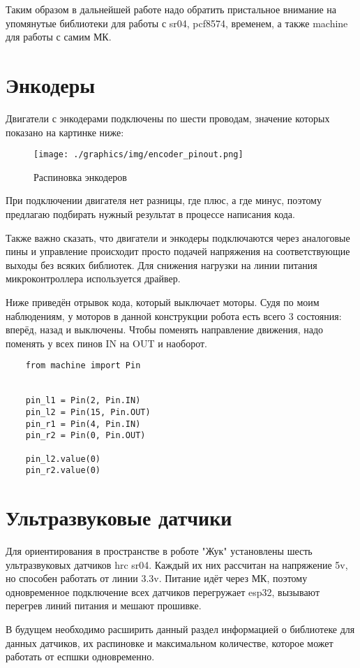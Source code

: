 Таким образом в дальнейшей работе надо обратить пристальное внимание на упомянутые библиотеки для работы с sr04, pcf8574, временем, а также machine для работы с самим МК.

\chapter{Энкодеры}
Двигатели с энкодерами подключены по шести проводам, значение которых показано на картинке ниже:

\begin{figure}[!h]
    \texttt{[image: ./graphics/img/encoder\_pinout.png]}
    \caption{Распиновка энкодеров}
    \label{f:enc_pinout}
\end{figure}

При подключении двигателя нет разницы, где плюс, а где минус, поэтому предлагаю подбирать нужный результат в процессе написания кода.

Также важно сказать, что двигатели и энкодеры подключаются через аналоговые пины и управление происходит просто подачей напряжения на соответствующие выходы без всяких библиотек. Для снижения нагрузки на линии питания микроконтроллера используется драйвер.

Ниже приведён отрывок кода, который выключает моторы. Судя по моим наблюдениям, у моторов в данной конструкции робота есть всего 3 состояния: вперёд, назад и выключены. Чтобы поменять направление движения, надо поменять у всех пинов IN на OUT и наоборот.

{\ttfamily
\begin{verbatim}
    from machine import Pin


    pin_l1 = Pin(2, Pin.IN)
    pin_l2 = Pin(15, Pin.OUT)
    pin_r1 = Pin(4, Pin.IN)
    pin_r2 = Pin(0, Pin.OUT)

    pin_l2.value(0)
    pin_r2.value(0)
\end{verbatim}
}

\chapter{Ультразвуковые датчики}
Для ориентирования в пространстве в роботе "Жук" установлены шесть ультразвуковых датчиков hrc sr04. Каждый их них рассчитан на напряжение 5v, но способен работать от линии 3.3v. Питание идёт через МК, поэтому одновременное подключение всех датчиков перегружает esp32, вызывают перегрев линий питания и мешают прошивке.

В будущем необходимо расширить данный раздел информацией о библиотеке для данных датчиков, их распиновке и максимальном количестве, которое может работать от еспшки одновременно.

